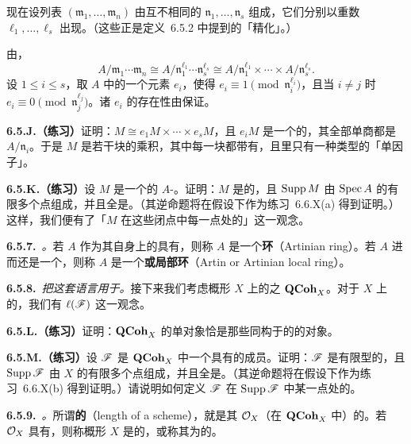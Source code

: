 现在设列表 $(\mathfrak{m}_1,\dots,\mathfrak{m}_n)$ 由互不相同的\trMaximalIdeal{} $\mathfrak{n}_1,\dots,\mathfrak{n}_s$ 组成，它们分别以重数 $\ell_1,\dots,\ell_s$ 出现。（这些正是定义~6.5.2 中提到的「精化」\trLength{}。）

由\trChineseRemainderTheorem，
\[
A/\mathfrak{m}_1\cdots\mathfrak{m}_n\cong A/\mathfrak{n}_1^{\ell_1}\cdots\mathfrak{n}_s^{\ell_s}\cong A/\mathfrak{n}_1^{\ell_1}\times\cdots\times A/\mathfrak{n}_s^{\ell_s}.
\]
设 $1\le i\le s$，取 $A$ 中的一个元素 $e_i$，使得 $e_i\equiv 1\pmod{\mathfrak{n}_i^{\ell_i}}$，且当 $i\neq j$ 时 $e_i\equiv 0\pmod{\mathfrak{n}_j^{\ell_j}}$。诸 $e_i$ 的存在性由\trChineseRemainderTheorem{}保证。

\textbf{6.5.J.（练习）}\quad 证明：$M\cong e_1M\times\cdots\times e_sM$，且 $e_iM$ 是一个\trFiniteLength{}的\trModule，其全部单商都是 $A/\mathfrak{n}_i$。于是 $M$ 是若干块的乘积，其中每一块都带有\trCompositionSeries{}，且\trCompositionSeries{}里只有一种类型的「单因子」。

\textbf{6.5.K.（练习）}\quad 设 $M$ 是一个\trFiniteLength{}的 $A$-\trModule。证明：$M$ 是\trFinitelyGenerated{}的，且 $\operatorname{Supp} M$ 由 $\operatorname{Spec} A$ 的有限多个点组成，并且全是\trClosedPoint。（其逆命题将在\trNoetherian{}假设下作为练习~6.6.X(a) 得到证明。）这样，我们便有了「$M$ 在这些闭点中每一点处的\trLength{}」这一观念。

\textbf{6.5.7.}\ \emph{\trhDefinition{}。}\quad 若 $A$ 作为其自身上的\trModule{}具有\trFiniteLength{}，则称 $A$ 是一个\textbf{\trArtinian{}环}（Artinian ring）。若 $A$ 进而还是一个\trLocalRing，则称 $A$ 是一个\textbf{\trArtin{}或\trArtinian{}局部环}（Artin or Artinian local ring）。

\textbf{6.5.8.}\ \emph{把这套语言用于\trScheme{}。}\quad 接下来我们考虑概形 $X$ 上的\trQCSheaf{}之\trCategory{} $\mathbf{QCoh}_X$。对于 $X$ 上\trFiniteLength{}的\trQCSheaf，我们有\trLength{} $\ell(\mathscr{F})$ 这一观念。

\textbf{6.5.L.（练习）}\quad 证明：$\mathbf{QCoh}_X$ 的单对象恰是那些同构于\trClosedPoint{}的\trStructureSheaf{}的对象。

\textbf{6.5.M.（练习）}\quad 设 $\mathscr{F}$ 是 $\mathbf{QCoh}_X$ 中一个具有\trFiniteLength{}的成员。证明：$\mathscr{F}$ 是有限型的，且 $\operatorname{Supp}\mathscr{F}$ 由 $X$ 的有限多个点组成，并且全是\trClosedPoint。（其逆命题将在\trNoetherian{}假设下作为练习~6.6.X(b) 得到证明。）请说明如何定义 $\mathscr{F}$ 在 $\operatorname{Supp}\mathscr{F}$ 中某一点处的\trLength{}。

\textbf{6.5.9.}\ \emph{\trhDefinition{}。}\quad 所谓\textbf{\trScheme{}的\trLength{}}（length of a scheme），就是其\trStructureSheaf{} $\mathcal{O}_X$（在 $\mathbf{QCoh}_X$ 中）的\trLength{}。若 $\mathcal{O}_X$ 具有\trFiniteLength{}，则称概形 $X$ 是\textbf{\trFiniteLength{}}的，或称其为\textbf{\trArtinian}的。
